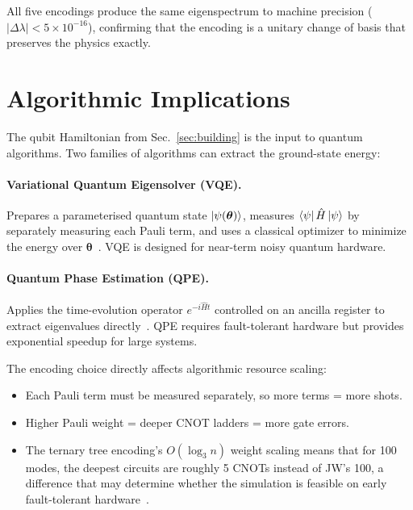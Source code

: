 \documentclass[aps,prb,preprint,longbibliography,nofootinbib]{revtex4-2}
\begin{document}
All five encodings produce the same eigenspectrum to machine precision
($|\Delta\lambda| < 5 \times 10^{-16}$), confirming that the encoding
is a unitary change of basis that preserves the physics exactly.

\section{Algorithmic Implications}
\label{sec:outlook}

The qubit Hamiltonian from Sec.~\ref{sec:building} is the input to
quantum algorithms.  Two families of algorithms can extract the
ground-state energy:

\paragraph{Variational Quantum Eigensolver (VQE).}
Prepares a parameterised quantum state
$\ket{\psi(\boldsymbol{\theta})}$, measures
$\bra{\psi}\hat{H}\ket{\psi}$ by separately measuring each Pauli term,
and uses a classical optimizer to minimize the energy over
$\boldsymbol{\theta}$~\cite{peruzzo2014,omalley2016}.  VQE is designed
for near-term noisy quantum hardware.

\paragraph{Quantum Phase Estimation (QPE).}
Applies the time-evolution operator $e^{-i\hat{H}t}$ controlled on an
ancilla register to extract eigenvalues
directly~\cite{nielsen2010}.  QPE requires fault-tolerant hardware but
provides exponential speedup for large systems.

The encoding choice directly affects algorithmic resource scaling:
\begin{itemize}
\item Each Pauli term must be measured separately, so more terms = more
  shots.
\item Higher Pauli weight = deeper CNOT ladders = more gate errors.
\item The ternary tree encoding's $O(\log_3 n)$ weight scaling means
  that for 100 modes, the deepest circuits are roughly 5 CNOTs instead
  of JW's 100, a difference that may determine whether the simulation
  is feasible on early fault-tolerant hardware~\cite{reiher2017}.
\end{itemize}

\end{document}
